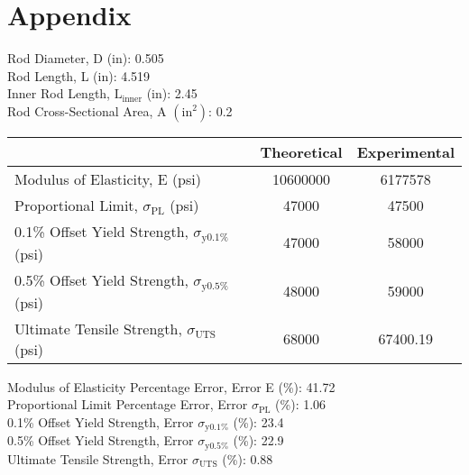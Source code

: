\documentclass{article}
\begin{document}
    \section{Appendix}
    \begin{center}
    \noindent Rod Diameter, D (in): 0.505\\
    Rod Length, L (in): 4.519 \\
    Inner Rod Length, \(\text{L}_\text{inner}\) (in): 2.45 \\
    Rod Cross-Sectional Area, A \(\left(\text{in}^2\right)\): 0.2 \\
    \end{center}
    \begin{center}
        \begin{tabular}{|l c c|}
            \hline
            & \textbf{Theoretical} & \textbf{Experimental} \\\hline
            Modulus of Elasticity, E (psi) & 10600000 & 6177578\\
            Proportional Limit, \(\sigma_\text{PL}\) (psi) & 47000 & 47500\\
            0.1\% Offset Yield Strength, \(\sigma_\text{y0.1\%}\) (psi) & 47000 & 58000\\
            0.5\% Offset Yield Strength, \(\sigma_\text{y0.5\%}\) (psi) & 48000 & 59000\\
            Ultimate Tensile Strength, \(\sigma_\text{UTS}\) (psi) & 68000 & 67400.19\\\hline 
        \end{tabular}
        \vspace{2mm}
    \end{center}
    \begin{center}
        Modulus of Elasticity Percentage Error, Error E (\%): 41.72 \\
        Proportional Limit Percentage Error, Error \(\sigma_\text{PL}\) (\%): 1.06\\
        0.1\% Offset Yield Strength, Error \(\sigma_\text{y0.1\%}\) (\%): 23.4\\
        0.5\% Offset Yield Strength, Error \(\sigma_\text{y0.5\%}\) (\%): 22.9\\
        Ultimate Tensile Strength, Error \(\sigma_\text{UTS}\) (\%): 0.88\\
    \end{center}
\end{document}

